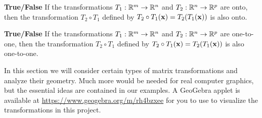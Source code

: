\item \textbf{True/False} If the transformations $T_1: \mathbb{R}^m \to \mathbb{R}^n$ and $T_2:\mathbb{R}^n \to \mathbb{R}^p$ are onto, then the transformation $T_2 \circ T_1$ defined by $T_2\circ T_1(\mathbf{x})=T_2(T_1(\mathbf{x}))$ is also onto.

\item \textbf{True/False} If the transformations $T_1: \mathbb{R}^m \to \mathbb{R}^n$ and $T_2:\mathbb{R}^n \to \mathbb{R}^p$ are one-to-one, then the transformation $T_2 \circ T_1$ defined by $T_2\circ T_1(\mathbf{x})=T_2(T_1(\mathbf{x}))$ is also one-to-one.

\ea
\ee

\label{sec:proj_geom_mtx}

In this section we will consider certain types of matrix transformations and analyze their geometry. Much more would be needed for real computer graphics, but the essential ideas are contained in our examples. A GeoGebra applet is available at \url{https://www.geogebra.org/m/rh4bzxee} for you to use to visualize the transformations in this project. 

